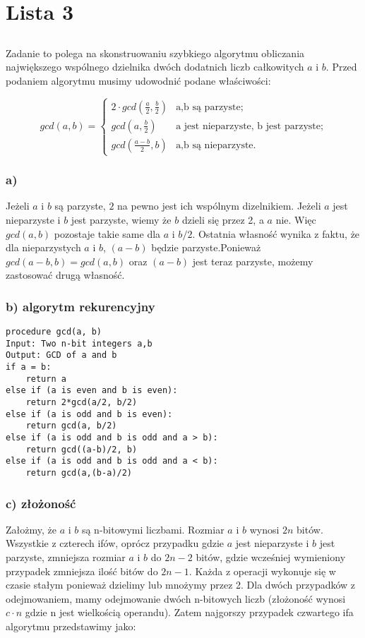 \chapter{Lista 3}

\section{} %
Zadanie to polega na skonstruowaniu szybkiego algorytmu obliczania największego wspólnego dzielnika dwóch dodatnich liczb całkowitych $a$ i $b$. Przed podaniem algorytmu musimy udowodnić podane właściwości:

\begin{equation*}
gcd(a,b) =
 \begin{cases}
 2 \cdot gcd( \frac{a}{2}, \frac{b}{2}) & \text{a,b są parzyste;} \\
 gcd(a,\frac{b}{2}) & \text{a jest nieparzyste, b jest parzyste;} \\
 gcd(\frac{a-b}{2},b) & \text{a,b są nieparzyste.}
 \end{cases}
 \end{equation*}

\subsection{a)}
Jeżeli $a$ i $b$ są parzyste, $2$ na pewno jest ich wspólnym dizelnikiem. Jeżeli $a$ jest nieparzyste i $b$ jest parzyste, wiemy że $b$ dzieli się przez 2, a $a$ nie. Więc $gcd(a,b)$ pozostaje takie same dla $a$ i $b/2$. Ostatnia własność wynika z faktu, że dla nieparzystych $a$ i $b$, $(a-b)$ będzie parzyste.Ponieważ $gcd(a-b,b) = gcd(a,b)$ oraz $(a-b)$ jest teraz parzyste, możemy zastosować drugą własność.

\subsection{b) algorytm rekurencyjny}
\begin{lstlisting}
procedure gcd(a, b)
Input: Two n-bit integers a,b
Output: GCD of a and b
if a = b:
	return a
else if (a is even and b is even):
	return 2*gcd(a/2, b/2)
else if (a is odd and b is even):
	return gcd(a, b/2)
else if (a is odd and b is odd and a > b):
	return gcd((a-b)/2, b)
else if (a is odd and b is odd and a < b):
	return gcd(a,(b-a)/2)
\end{lstlisting}
\subsection{c) złożoność}
Założmy, że $a$ i $b$ są n-bitowymi liczbami. Rozmiar $a$ i $b$ wynosi $2n$ bitów. Wszystkie z czterech ifów, oprócz przypadku gdzie $a$ jest nieparzyste i $b$ jest parzyste, zmniejsza rozmiar $a$ i $b$ do $2n - 2$ bitów, gdzie wcześniej wymieniony przypadek zmniejsza ilość bitów do $2n-1$. Każda z operacji wykonuje się w czasie stałym ponieważ dzielimy lub mnożymy przez 2. Dla dwóch przypadków z odejmowaniem, mamy odejmowanie dwóch n-bitowych liczb (złożoność wynosi $c\cdot n$ gdzie n jest wielkością operandu). Zatem najgorszy przypadek czwartego ifa algorytmu przedstawimy jako:

